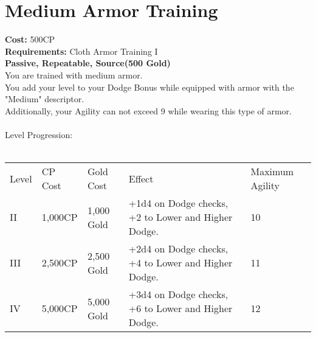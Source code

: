 \section{Medium Armor Training}\label{perk:mediumArmorTraining}
\textbf{Cost:} 500CP\\
\textbf{Requirements:} Cloth Armor Training I\\
\textbf{Passive, Repeatable, Source(500 Gold)}\\
You are trained with medium armor.\\
You add your level to your Dodge Bonus while equipped with armor with the "Medium" descriptor.\\
Additionally, your Agility can not exceed 9 while wearing this type of armor.\\
\\
Level Progression:\\
\\
\begin{tabular}{l | l | l | l | l}
	Level & CP Cost & Gold Cost & Effect & Maximum Agility
	\\
	II
	& 1,000CP
	& 1,000 Gold
	& +1d4 on Dodge checks, +2 to Lower and Higher Dodge.
	& 10
	\\
	III
	& 2,500CP
	& 2,500 Gold
	& +2d4 on Dodge checks, +4 to Lower and Higher Dodge.
	& 11
	\\
	IV
	& 5,000CP
	& 5,000 Gold
	& +3d4 on Dodge checks, +6 to Lower and Higher Dodge.
	& 12
	\\
\end{tabular}